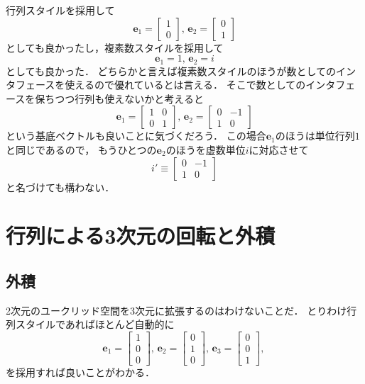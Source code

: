 \documentclass{jsbook}
\newcommand{\bvec}[1]{\boldsymbol{#1}}
\newcommand{\One}{1}%
\newcommand{\im}{i}%
\newcommand{\ve}{\bvec{e}}
\begin{document}
行列スタイルを採用して
\begin{equation}
\ve_1=\begin{bmatrix}1\\0\end{bmatrix},\,
\ve_2=\begin{bmatrix}0\\1\end{bmatrix}
\end{equation}
としても良かったし，複素数スタイルを採用して
\begin{equation}
\ve_1=1,\,
\ve_2=\im
\end{equation}
としても良かった．
どちらかと言えば複素数スタイルのほうが数としてのインタフェースを使えるので優れているとは言える．
そこで数としてのインタフェースを保ちつつ行列も使えないかと考えると
\begin{equation}
\ve_1=\begin{bmatrix}1&0\\0&1\end{bmatrix},\,
\ve_2=\begin{bmatrix}0&-1\\1&0\end{bmatrix}
\end{equation}
という基底ベクトルも良いことに気づくだろう．
この場合$\ve_1$のほうは単位行列$\One$と同じであるので，
もうひとつの$\ve_2$のほうを虚数単位$\im$に対応させて
\begin{equation}
\im'\equiv\begin{bmatrix}0&-1\\1&0\end{bmatrix}
\end{equation}
と名づけても構わない．
%
%

\section{行列による3次元の回転と外積}

\subsection{外積}

2次元のユークリッド空間を3次元に拡張するのはわけないことだ．
とりわけ行列スタイルであればほとんど自動的に
\begin{equation}
\ve_1=\begin{bmatrix}1\\0\\0\end{bmatrix},\,
\ve_2=\begin{bmatrix}0\\1\\0\end{bmatrix},\,
\ve_3=\begin{bmatrix}0\\0\\1\end{bmatrix},\,
\end{equation}
を採用すれば良いことがわかる．
\end{document}
